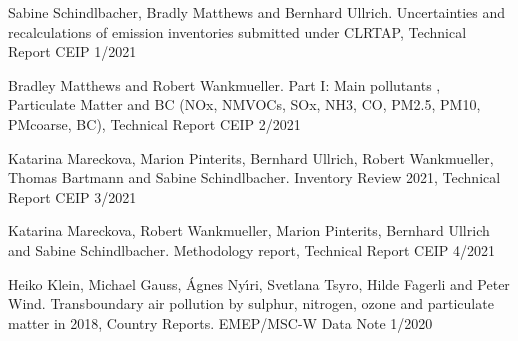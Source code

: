 \enlargethispage{\baselineskip}
\begin{list}{}{\setlength{\leftmargin}{15pt}\setlength{\itemindent}{-\leftmargin}}\small

\item[]  
Sabine Schindlbacher, Bradly Matthews and Bernhard Ullrich. Uncertainties and recalculations of emission inventories submitted under CLRTAP, Technical Report CEIP 1/2021

\item[]
Bradley Matthews and Robert Wankmueller. Part I:  Main pollutants , Particulate Matter and BC (NOx, NMVOCs, SOx, NH3, CO, PM2.5, PM10, PMcoarse, BC), Technical Report CEIP 2/2021

\item[]
 Katarina Mareckova, Marion Pinterits, Bernhard Ullrich,  Robert Wankmueller, Thomas Bartmann and Sabine Schindlbacher. Inventory Review 2021,  Technical Report CEIP 3/2021
  
\item[]
Katarina Mareckova, Robert Wankmueller, Marion Pinterits, Bernhard Ullrich and Sabine Schindlbacher. Methodology report, Technical Report CEIP 4/2021

\end{list}



 \enlargethispage{\baselineskip}
 \begin{list}{}{\setlength{\leftmargin}{15pt}\setlength{\itemindent}{-\leftmargin}}\small

 \item[]
 Heiko Klein, Michael Gauss, \'Agnes  Ny\'{\i}ri, Svetlana Tsyro, Hilde Fagerli and Peter Wind. 
Transboundary air pollution by sulphur, nitrogen, ozone and particulate matter in 2018, Country Reports. EMEP/MSC-W Data Note 1/2020


 \end{list}







\newpage
\renewcommand\bibname{References}      %

